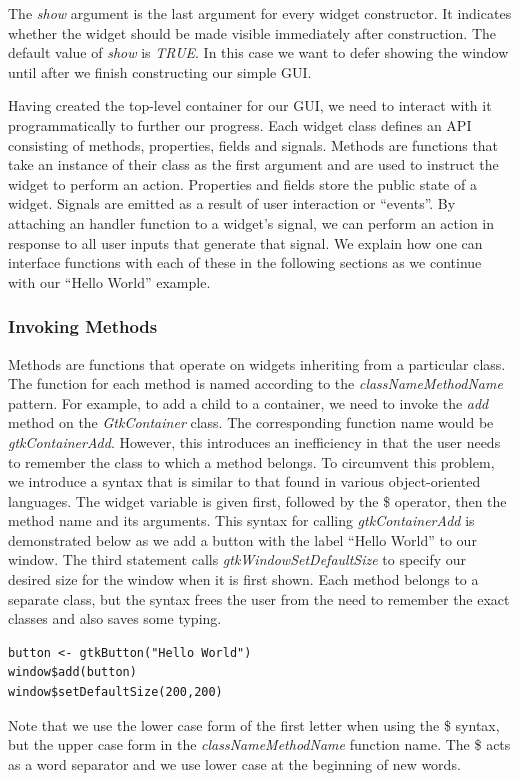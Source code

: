 \documentclass[article]{jss}
\begin{document}
The \emph{show} argument is the last argument for every widget constructor. It
indicates whether the widget should be made visible immediately after construction.
The default value of \emph{show} is \emph{TRUE}. In this case we want to
defer showing the window until after we finish constructing our simple
GUI.

Having created the top-level container for our GUI, we need to interact with it
programmatically to further our progress. Each widget class defines an API 
consisting of methods, properties, fields and signals. Methods are functions 
that take an instance of their class as the first argument and are used to instruct the 
widget to perform an action. Properties and fields store the public
state of a widget. 
Signals are emitted as a result of user interaction or ``events''.
By attaching an  handler function to a widget's signal, we can
perform an action in response to all user inputs that generate that
signal. We explain how one can interface  functions with
each of these in the following sections as we continue with our
``Hello World'' example.

\subsubsection{Invoking Methods}

Methods are functions that operate on widgets inheriting from a particular class.
The  function for each  method is named according
to the 
\emph{classNameMethodName} pattern. For example, to add a child to a container, we 
need to invoke the \emph{add} method on the \emph{GtkContainer} class. 
The corresponding function name would be \emph{gtkContainerAdd}. However, this 
introduces an inefficiency in that the user needs to remember the class to which
a method belongs. To circumvent this problem, we introduce a syntax that is similar
to that found in various object-oriented languages. The widget
variable is given first, followed by the \$ operator, then the method
name and its arguments. This syntax for calling \emph{gtkContainerAdd} is demonstrated 
below as we add a button with the label ``Hello World'' to our window. The
third statement calls \emph{gtkWindowSetDefaultSize} to specify our desired
size for the window when it is first shown. Each method belongs to a separate
class, but the syntax frees the user from the need to remember the exact classes
and also saves some typing.
\begin{verbatim}
button <- gtkButton("Hello World")
window$add(button)
window$setDefaultSize(200,200)
\end{verbatim}
Note that we use the lower case form of the first letter when using
the \$ syntax, but the upper case form in the
\emph{classNameMethodName} function name. The \$ acts as a word
separator and we use lower case at the beginning of new words.
\end{document}
